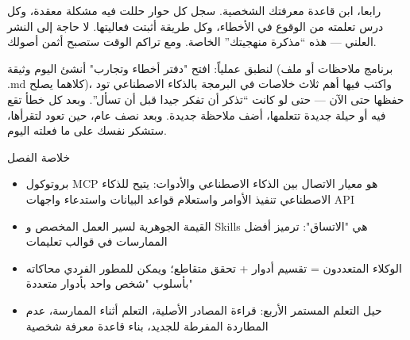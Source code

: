 رابعا، ابن قاعدة معرفتك الشخصية. سجل كل حوار حللت فيه مشكلة معقدة، وكل درس تعلمته من الوقوع في الأخطاء، وكل طريقة أثبتت فعاليتها. لا حاجة إلى النشر العلني — هذه “مذكرة منهجيتك” الخاصة. ومع تراكم الوقت ستصبح أثمن أصولك.

\begin{tcbpractice}{لنطبق عملياً: افتح "دفتر أخطاء وتجارب"}
أنشئ اليوم وثيقة (برنامج ملاحظات أو ملف .md كلاهما يصلح)، واكتب فيها أهم ثلاث خلاصات في البرمجة بالذكاء الاصطناعي تود حفظها حتى الآن — حتى لو كانت “تذكر أن تفكر جيدا قبل أن تسأل”. وبعد كل خطأ تقع فيه أو حيلة جديدة تتعلمها، أضف ملاحظة جديدة. وبعد نصف عام، حين تعود لتقرأها، ستشكر نفسك على ما فعلته اليوم.

\end{tcbpractice}

\begin{tcbsummary}{خلاصة الفصل}
\begin{itemize}
  \item بروتوكول MCP هو معيار الاتصال بين الذكاء الاصطناعي والأدوات: يتيح للذكاء الاصطناعي تنفيذ الأوامر واستعلام قواعد البيانات واستدعاء واجهات API
  \item القيمة الجوهرية لسير العمل المخصص و Skills هي "الاتساق": ترميز أفضل الممارسات في قوالب تعليمات
  \item الوكلاء المتعددون = تقسيم أدوار + تحقق متقاطع؛ ويمكن للمطور الفردي محاكاته بأسلوب "شخص واحد بأدوار متعددة"
  \item حيل التعلم المستمر الأربع: قراءة المصادر الأصلية، التعلم أثناء الممارسة، عدم المطاردة المفرطة للجديد، بناء قاعدة معرفة شخصية
\end{itemize}

\end{tcbsummary}
